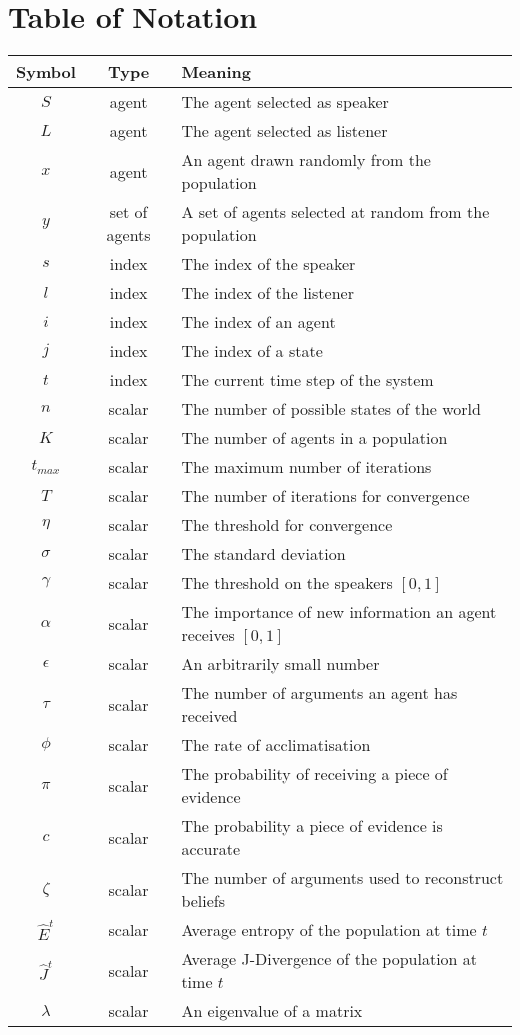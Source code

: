 \section*{Table of Notation}
\begin{table}[H]
\begin{tabular}{c|c|l} \hline
Symbol & Type &  Meaning \\ \hline
$S$ & agent & The agent selected as speaker \\
$L$ & agent & The agent selected as listener\\ 
$x$ & agent & An agent drawn randomly from the population \\
$y$ & set of agents & A set of agents selected at random from the population  \\ \hline

$s$ & index & The index of the speaker   \\
$l$ & index & The index of the listener\\
$i$ & index & The index of an agent\\
$j$ & index & The index of a state\\
$t$ & index & The current time step of the system\\  \hline 

$n$ & scalar & The number of possible states of the world \\
$K$ & scalar & The number of agents in a population \\
$t_{max}$ & scalar & The maximum number of iterations \\
$T$ & scalar & The number of iterations for convergence \\
$\eta$ & scalar & The threshold for convergence\\
$\sigma$ & scalar & The standard deviation \\
$\gamma$ & scalar & The threshold on the speakers $[0,1]$\\
$\alpha$ & scalar & The importance of new information an agent receives $[0,1]$ \\
$\epsilon$ & scalar & An arbitrarily small number \\
$\tau$ & scalar & The number of arguments an agent has received \\
$\phi$ & scalar & The rate of acclimatisation \\
$\pi$ & scalar & The probability of receiving a piece of evidence\\
$c$ & scalar & The probability a piece of evidence is accurate \\
$\zeta$ & scalar & The number of arguments used to reconstruct beliefs\\
$\hat{E}^t$ & scalar & Average entropy of the population at time $t$ \\
$\hat{J}^t$ & scalar & Average J-Divergence of the population at time $t$ \\
$\lambda$ & scalar & An eigenvalue of a matrix \\ \hline



\end{tabular}
\end{table}
